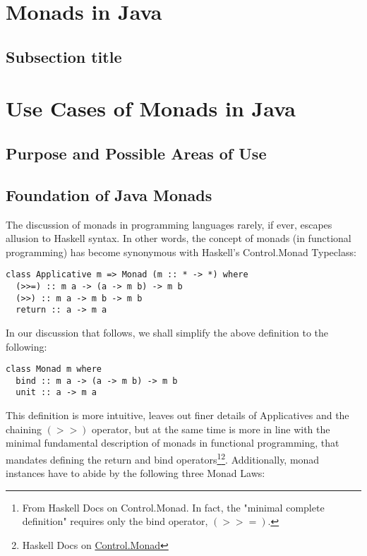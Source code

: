 \section{Monads in Java}
\label{sec:1}

\subsection{Subsection title}
\label{sec:2}

\section{Use Cases of Monads in Java}
\label{sec:3}

\subsection{Purpose and Possible Areas of Use}
\label{sec:4}

\subsection{Foundation of Java Monads}
\label{sec:5}

The discussion of monads in programming languages rarely, if ever, escapes allusion to Haskell syntax. In other words, the concept of monads (in functional programming) has become synonymous with Haskell's Control.Monad Typeclass:

\begin{verbatim}
class Applicative m => Monad (m :: * -> *) where
  (>>=) :: m a -> (a -> m b) -> m b
  (>>) :: m a -> m b -> m b
  return :: a -> m a
\end{verbatim}

In our discussion that follows, we shall simplify the above definition to the following:

\begin{verbatim}
class Monad m where
  bind :: m a -> (a -> m b) -> m b
  unit :: a -> m a
\end{verbatim}

This definition is more intuitive, leaves out finer details of Applicatives and the chaining $(>>)$ operator, but at the same time is more in line with the minimal fundamental description of monads in functional programming, that mandates defining the return and bind operators\footnote{From Haskell Docs on Control.Monad. In fact, the "minimal complete definition" requires only the bind operator, $(>>=)$.}\footnote{Haskell Docs on \href{https://hackage.haskell.org/package/base-4.14.0.0/docs/Control-Monad.html}{Control.Monad}}. Additionally, monad instances have to abide by the following three Monad Laws:

